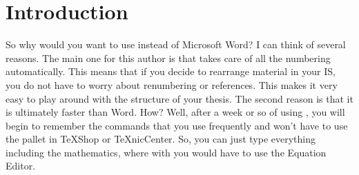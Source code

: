 \chapter{Introduction}\label{intro}
So why would you want to use \lt instead of Microsoft Word\texttrademark? I can think of several reasons. The main one for this author is that \lt takes care of all the numbering automatically. This means that if you decide to rearrange material in your IS, you do not have to worry about renumbering or references. This makes it very easy to play around with the structure of your thesis. The second reason is that it is ultimately faster than Word\texttrademark. How? Well, after a week or so of using \lt, you will begin to remember the commands that you use frequently and won't have to use the \lt pallet in TeXShop or TeXnicCenter. So, you can just type everything including the mathematics, where with \msw you would have to use the Equation Editor.
